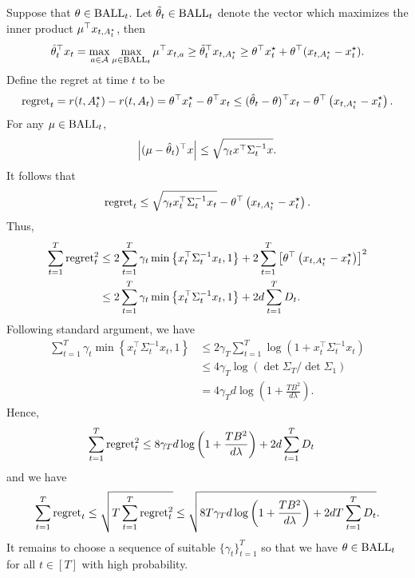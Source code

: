 \documentclass[letterpaper,11pt]{article}
\begin{document}
Suppose that $\theta \in \operatorname{BALL}_t$.
Let $\tilde{\theta}_t \in \operatorname{BALL}_t$ denote the vector which maximizes the inner product $\mu^\top x_{t,A^\star_t}$, then
\begin{equation*}
    \hat{\theta}_t^\top x_t = \max_{a \in \mathcal{A}} \max_{\mu \in \operatorname{BALL}_t} \mu^\top x_{t,a} \geq \tilde{\theta}_t^\top x_{t, A^\star_t} \geq \theta^\top x^\star_t + \theta^\top (x_{t,A^\star_t} - x^\star_t). 
\end{equation*}
Define the regret at time $t$ to be 
\begin{equation*}
    \mathrm{regret}_t = r(t, A^\star_t) - r(t, A_t) = \theta^\top x^\star_t - \theta^\top x_t \leq (\hat{\theta}_t - \theta)^\top x_t - \theta^\top \left(x_{t,A^\star_t} - x^\star_t\right). 
\end{equation*}
For any $\mu \in \operatorname{BALL}_t$, 
\begin{equation*}
    \left|(\mu - \hat{\theta}_t)^\top x\right| \leq \sqrt{\gamma_t x^\top \Sigma_t^{-1} x}. 
\end{equation*}
It follows that 
\begin{equation*}
    \mathrm{regret}_t \leq \sqrt{\gamma_t x_t^\top \Sigma_t^{-1} x_t} - \theta^\top \left(x_{t,A^\star_t} - x^\star_t\right). 
\end{equation*}
Thus, 
\begin{equation*}
\begin{aligned}
     \sum_{t=1}^T \mathrm{regret}_t^2 &\leq 2\sum_{t=1}^T \gamma_t \min\left\{x_t^\top \Sigma_t^{-1} x_t, 1\right\} + 2\sum_{t=1}^T \left[\theta^\top \left(x_{t,A^\star_t} - x^\star_t\right)\right]^2\\
    &\leq 2\sum_{t=1}^T \gamma_t \min\left\{x_t^\top \Sigma_t^{-1} x_t, 1\right\} + 2 d \sum_{t=1}^T D_t. 
\end{aligned}
\end{equation*}
Following standard argument, we have 
\begin{equation*}
\begin{aligned}
    \sum_{t=1}^{T} \gamma_t \min\left\{x_t^\top \Sigma_t^{-1} x_t, 1\right\} &\leq 2\gamma_T \sum_{t=1}^T \log\left(1 + x_t^\top \Sigma_t^{-1} x_t\right) \\
    &\leq 4\gamma_{T} \log\left(\det \Sigma_{T} / \det \Sigma_1 \right) \\
    &= 4 \gamma_T d \log\left(1+\frac{T B^2}{d \lambda}\right).
\end{aligned}
\end{equation*}
Hence, 
\begin{equation*}
\begin{aligned}
     \sum_{t=1}^T \mathrm{regret}_t^2 
    &\leq 8 \gamma_T d \log\left(1+\frac{T B^2}{d \lambda}\right) + 2 d \sum_{t=1}^T D_t
\end{aligned}
\end{equation*}
and we have 
\begin{equation*}
    \sum_{t=1}^T \mathrm{regret}_t \leq \sqrt{T \sum_{t=1}^T \mathrm{regret}_t^2} \leq \sqrt{8T\gamma_T d \log \left(1 + \frac{T B^2}{d \lambda}\right) + 2dT \sum_{t=1}^T D_t}. 
\end{equation*}
It remains to choose a sequence of suitable $\{\gamma_t\}_{t=1}^T$ so that we have $\theta \in \operatorname{BALL}_t$ for all $t \in [T]$ with high probability.   
\end{document}
